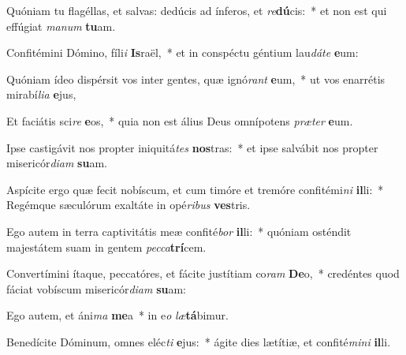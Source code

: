 \item Quóniam tu flagéllas, et salvas: dedúcis ad ínferos, et \textit{re}\textbf{dú}cis:~* et non est qui effúgiat \textit{ma}\textit{num} \textbf{tu}am.
\item Confitémini Dómino, fíli\textit{i} \textbf{Is}raël,~* et in conspéctu géntium lau\textit{dá}\textit{te} \textbf{e}um:
\item Quóniam ídeo dispérsit vos inter gentes, quæ ignó\textit{rant} \textbf{e}um,~* ut vos enarrétis mirabí\textit{li}\textit{a} \textbf{e}jus,
\item Et faciátis sci\textit{re} \textbf{e}os,~* quia non est álius Deus omnípotens \textit{præ}\textit{ter} \textbf{e}um.
\item Ipse castigávit nos propter iniquitá\textit{tes} \textbf{nos}tras:~* et ipse salvábit nos propter misericór\textit{di}\textit{am} \textbf{su}am.
\item Aspícite ergo quæ fecit nobíscum, et cum timóre et tremóre confitémi\textit{ni} \textbf{il}li:~* Regémque sæculórum exaltáte in opé\textit{ri}\textit{bus} \textbf{ves}tris.
\item Ego autem in terra captivitátis meæ confité\textit{bor} \textbf{il}li:~* quóniam osténdit majestátem suam in gentem \textit{pec}\textit{ca}\textbf{trí}cem.
\item Convertímini ítaque, peccatóres, et fácite justítiam co\textit{ram} \textbf{De}o,~* credéntes quod fáciat vobíscum misericór\textit{di}\textit{am} \textbf{su}am:
\item Ego autem, et áni\textit{ma} \textbf{me}a~* in e\textit{o} \textit{læ}\textbf{tá}bimur.
\item Benedícite Dóminum, omnes eléc\textit{ti} \textbf{e}jus:~* ágite dies lætítiæ, et confité\textit{mi}\textit{ni} \textbf{il}li.
